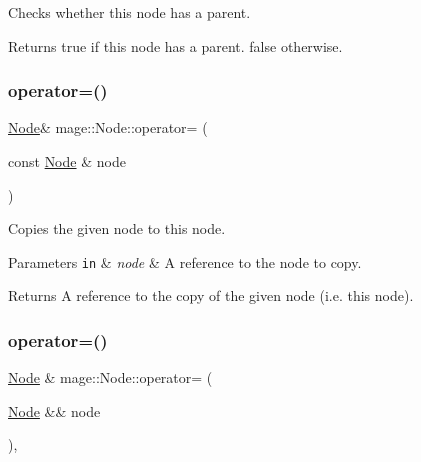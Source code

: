 Checks whether this node has a parent.

\begin{DoxyReturn}{Returns}
{\ttfamily true} if this node has a parent. {\ttfamily false} otherwise. 
\end{DoxyReturn}
\mbox{\label{classmage_1_1_node_ad10ea13608963acfa06d3c1577314da5}} 
\subsubsection{\texorpdfstring{operator=()}{operator=()}\hspace{0.1cm}{\footnotesize\ttfamily [1/2]}}
{\footnotesize\ttfamily \mbox{\hyperlink{classmage_1_1_node}{Node}}\& mage\+::\+Node\+::operator= (\begin{DoxyParamCaption}\item[{const \mbox{\hyperlink{classmage_1_1_node}{Node}} \&}]{node }\end{DoxyParamCaption})\hspace{0.3cm}{\ttfamily [delete]}}

Copies the given node to this node.


\begin{DoxyParams}[1]{Parameters}
\mbox{\tt in}  & {\em node} & A reference to the node to copy. \\
\hline
\end{DoxyParams}
\begin{DoxyReturn}{Returns}
A reference to the copy of the given node (i.\+e. this node). 
\end{DoxyReturn}
\mbox{\label{classmage_1_1_node_a10d0ed7f0ade94ce7cbd6f413ae82757}} 
\subsubsection{\texorpdfstring{operator=()}{operator=()}\hspace{0.1cm}{\footnotesize\ttfamily [2/2]}}
{\footnotesize\ttfamily \mbox{\hyperlink{classmage_1_1_node}{Node}} \& mage\+::\+Node\+::operator= (\begin{DoxyParamCaption}\item[{\mbox{\hyperlink{classmage_1_1_node}{Node}} \&\&}]{node }\end{DoxyParamCaption})\hspace{0.3cm}{\ttfamily [default]}, {\ttfamily [noexcept]}}

